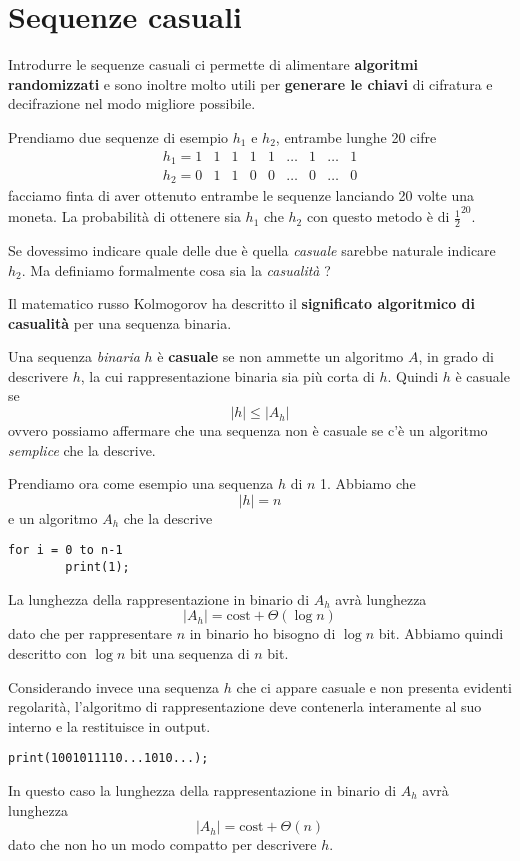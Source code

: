 \chapter{Sequenze casuali}\label{casualita}
Introdurre le sequenze casuali ci permette di alimentare \textbf{algoritmi randomizzati} e sono inoltre molto utili
per \textbf{generare le chiavi} di cifratura e decifrazione nel modo migliore possibile.

Prendiamo due sequenze di esempio $h_1$ e $h_2$, entrambe lunghe 20 cifre
\[
	\begin{matrix}
		h_1 = 1 & 1 & 1 & 1 & 1 & \dots & 1 & \dots & 1 \\
		h_2 = 0 & 1 & 1 & 0 & 0 & \dots & 0 & \dots & 0
	\end{matrix}
\]
facciamo finta di aver ottenuto entrambe le sequenze lanciando 20 volte una moneta. La probabilit\`a di ottenere sia
$h_1$ che $h_2$ con questo metodo \`e di $\frac{1}{2}^{20}$.

Se dovessimo indicare quale delle due \`e quella \emph{casuale} sarebbe naturale indicare $h_2$. Ma definiamo formalmente
cosa sia la \emph{casualit\`a} ?

Il matematico russo Kolmogorov ha descritto il \textbf{significato algoritmico di casualit\`a} per una sequenza binaria.

\begin{definition}[Kolmogorov]
	Una sequenza \emph{binaria} $h$ \`e \textbf{casuale} se non ammette un algoritmo $A$, in grado di descrivere $h$, la
	cui rappresentazione binaria sia pi\`u corta di $h$. Quindi $h$ \`e casuale se
	\[ |h| \leq |A_h| \]
	ovvero possiamo affermare che una sequenza non \`e casuale se c'\`e un algoritmo \emph{semplice} che la descrive.
\end{definition}

\begin{example}
	Prendiamo ora come esempio una sequenza $h$ di $n$ 1. Abbiamo che
	\[ |h| = n \]
	e un algoritmo $A_h$ che la descrive
	\begin{lstlisting}[style=pseudo-style]
	for i = 0 to n-1
		print(1);
	\end{lstlisting}
	La lunghezza della rappresentazione in binario di $A_h$ avr\`a lunghezza
	\[ |A_h| = \text{cost} + \Theta(\log n) \]
	dato che per rappresentare $n$ in binario ho bisogno di $\log n$ bit. Abbiamo quindi descritto con $\log n$	bit
	una sequenza di $n$ bit.
\end{example}

\begin{example}
	Considerando invece una sequenza $h$ che ci appare casuale e non presenta evidenti regolarit\`a, l'algoritmo di
	rappresentazione deve contenerla interamente al suo interno e la restituisce in output.
	\begin{lstlisting}[style=pseudo-style]
	print(1001011110...1010...);
	\end{lstlisting}
	In questo caso la lunghezza della rappresentazione in binario di $A_h$ avr\`a lunghezza
	\[ |A_h| = \text{cost} + \Theta(n) \]
	dato che non ho un modo compatto per descrivere $h$.
\end{example}

